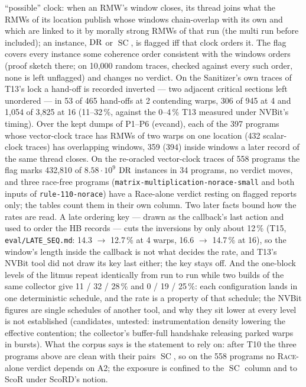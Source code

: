 \documentclass[11pt]{article}
\theoremstyle{remark}
\DeclareMathOperator{\SC}{SC}
\begin{document}
``possible'' clock: when an RMW's window closes, its thread joins what the RMWs of its
location publish whose windows chain-overlap with its own and which are linked to it by
morally strong RMWs of that run (the multi run before included); an instance, $\operatorname{DR}$ or $\SC$,
is flagged iff that clock orders it. The flag covers every instance some coherence order
consistent with the windows orders (proof sketch there; on 10,000 random traces, checked
against every such order, none is left unflagged) and changes no verdict. On the Sanitizer's
own traces of T13's lock a hand-off is recorded inverted --- two adjacent critical sections
left unordered --- in 53 of 465 hand-offs at 2 contending warps, 306 of 945 at 4 and 1,054 of
3,825 at 16 (11--32\,\%, against the 0--4\,\% T13 measured under NVBit's timing). Over the
kept dumps of P1--P6 (evcand), each of the 397 programs whose vector-clock trace has RMWs of
two warps on one location (432 scalar-clock traces) has overlapping windows, 359 (394) inside
windows a later record of the same thread closes. On the re-oracled vector-clock traces of
558 programs the flag marks 432,810 of $8.58\cdot 10^{9}$ $\operatorname{DR}$ instances in 34 programs, no
verdict moves, and three race-free programs (\texttt{matrix-multiplication-norace-small} and
both inputs of \texttt{rule-110-norace}) have a Race-alone verdict resting on flagged reports
only; the tables count them in their own column. Two later facts bound how the rates are
read. A late ordering key --- drawn as the callback's last action and used to order the HB
records --- cuts the inversions by only about 12\,\% (T15, \texttt{eval/LATE\_SEQ.md}:
14.3 $\to$ 12.7\,\% at 4 warps, 16.6 $\to$ 14.7\,\% at 16), so the window's length inside
the callback is not what decides the rate, and T13's NVBit tool did not draw its key last
either; the key stays off. And the one-block levels of the litmus repeat identically from
run to run while two builds of the same collector give 11 / 32 / 28\,\% and 0 / 19 / 25\,\%:
each configuration lands in one deterministic schedule, and the rate is a property of that
schedule; the NVBit figures are single schedules of another tool, and why they sit lower at
every level is not established (candidates, untested: instrumentation density lowering the
effective contention; the collector's buffer-full handshake releasing parked warps in
bursts). What the corpus says is the statement to rely on: after T10 the three programs above
are clean with their pairs $\SC$, so on the 558 programs no \textsc{Race}-alone verdict
depends on A2; the exposure is confined to the $\SC$ column and to ScoR under ScoRD's notion.
\end{document}
